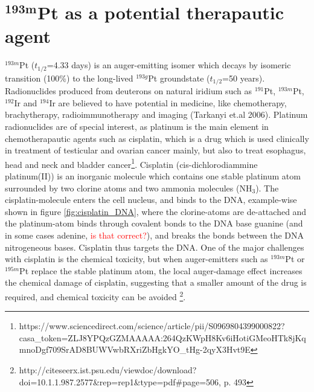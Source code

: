 \documentclass[a4paper,11pt,twoside]{book}
\begin{document}







\section{$\mathbf{^{193m}}$Pt as a potential therapautic agent}
$^{193m}$Pt ($t_{1/2}$=4.33 days) is an auger-emitting isomer which decays by isomeric transition (100\%) to the long-lived $^{193g}$Pt groundstate ($t_{1/2}$=50 years). Radionuclides produced from deuterons on natural iridium such as $^{191}$Pt, $^{193m}$Pt, $^{192}$Ir and $^{194}$Ir are believed to have potential in medicine, like chemotherapy, brachytherapy, radioimmunotherapy and imaging (Tarkanyi et.al 2006). Platinum radionuclides are of special interest, as platinum is the main element in chemotherapautic agents such as cisplatin, which is a drug which is used clinically in treatment of testicular and ovarian cancer mainly, but also to treat esophagus, head and neck and bladder cancer\footnote{https://www.sciencedirect.com/science/article/pii/S0969804399000822?casa_token=ZLJ8YPQzGZMAAAAA:264QzKWpH8Kv6iHotiGMeoHTk8jKqmnoDgf709SrAD8BUWVwbRXriZbHgkYO_tHg-2qyX3Hvt9E}. Cisplatin  (cis-dichlorodiammine platinum(II)) is an inorganic molecule which contains one stable platinum atom surrounded by two clorine atoms and two ammonia molecules (NH$_3$). The cisplatin-molecule enters the cell nucleus, and binds to the DNA, example-wise shown in figure \ref{fig:cisplatin_DNA}, where the clorine-atoms are de-attached and the platinum-atom binds through covalent bonds to the DNA base guanine (and in some cases adenine, \textcolor{red}{is that correct?}), and breaks the bonds between the DNA nitrogeneous bases. Cisplatin thus targets the DNA. One of the major challenges with cisplatin is the chemical toxicity, but when auger-emitters such as $^{193m}$Pt or $^{195m}$Pt replace the stable platinum atom, the local auger-damage effect increases the chemical damage of cisplatin, suggesting that a smaller amount of the drug is required, and chemical toxicity can be avoided \footnote{http://citeseerx.ist.psu.edu/viewdoc/download?doi=10.1.1.987.2577&rep=rep1&type=pdf#page=506, p. 493}. 
\end{document}
